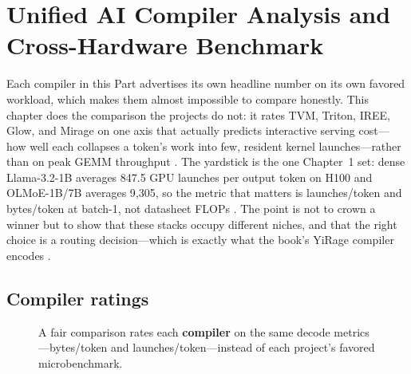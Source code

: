 \chapter{Unified AI Compiler Analysis and Cross-Hardware Benchmark}
\label{chap:ch21}

Each compiler in this Part advertises its own headline number on its own favored workload, which makes them almost impossible to compare honestly. This chapter does the comparison the projects do not: it rates TVM, Triton, IREE, Glow, and Mirage on one axis that actually predicts interactive serving cost---how well each collapses a token's work into few, resident kernel launches---rather than on peak GEMM throughput \citep{chen2018tvm,tillet2019triton,iree2024,rotem2018glow,wu2024mirage}. The yardstick is the one Chapter~1 set: dense Llama-3.2-1B averages 847.5 GPU launches per output token on H100 and OLMoE-1B/7B averages 9{,}305, so the metric that matters is launches/token and bytes/token at batch-1, not datasheet FLOPs \citep{taxbreak2026,memoryfloor2026}.
The point is not to crown a winner but to show that these stacks occupy different niches, and that the right choice is a routing decision---which is exactly what the book's YiRage compiler encodes \citep{yirage2026,patel2025llminference}.

\section{Compiler ratings}
\label{sec:ch21_compiler_ratings}


\begin{figure}[t]
\centering
{}
\caption{A fair comparison rates each \textbf{compiler} on the same decode metrics---bytes/token and launches/token---instead of each project's favored microbenchmark.}
\label{fig:compiler_ratings_pipeline}
\end{figure}

